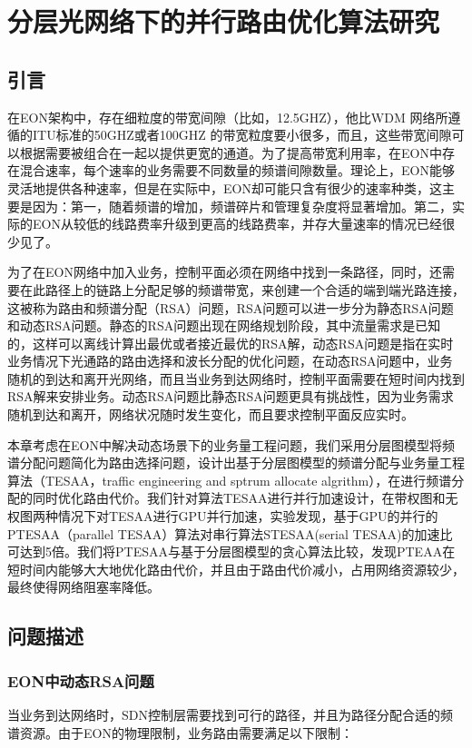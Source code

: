
\chapter{分层光网络下的并行路由优化算法研究}
\section{引言}
在EON架构中，存在细粒度的带宽间隙（比如，12.5GHZ），他比WDM 网络所遵循的ITU标准的50GHZ或者100GHZ 的带宽粒度要小很多，而且，这些带宽间隙可以根据需要被组合在一起以提供更宽的通道。为了提高带宽利用率，在EON中存在混合速率，每个速率的业务需要不同数量的频谱间隙数量。理论上，EON能够灵活地提供各种速率，但是在实际中，EON却可能只含有很少的速率种类，这主要是因为：第一，随着频谱的增加，频谱碎片和管理复杂度将显著增加。第二，实际的EON从较低的线路费率升级到更高的线路费率，并存大量速率的情况已经很少见了。

为了在EON网络中加入业务，控制平面必须在网络中找到一条路径，同时，还需要在此路径上的链路上分配足够的频谱带宽，来创建一个合适的端到端光路连接，这被称为路由和频谱分配（RSA）问题，RSA问题可以进一步分为静态RSA问题和动态RSA问题。静态的RSA问题出现在网络规划阶段，其中流量需求是已知的，这样可以离线计算出最优或者接近最优的RSA解，动态RSA问题是指在实时业务情况下光通路的路由选择和波长分配的优化问题，在动态RSA问题中，业务随机的到达和离开光网络，而且当业务到达网络时，控制平面需要在短时间内找到RSA解来安排业务。动态RSA问题比静态RSA问题更具有挑战性，因为业务需求随机到达和离开，网络状况随时发生变化，而且要求控制平面反应实时。

本章考虑在EON中解决动态场景下的业务量工程问题，我们采用分层图模型将频谱分配问题简化为路由选择问题，设计出基于分层图模型的频谱分配与业务量工程算法（TESAA，traffic engineering and sptrum allocate algrithm），在进行频谱分配的同时优化路由代价。我们针对算法TESAA进行并行加速设计，在带权图和无权图两种情况下对TESAA进行GPU并行加速，实验发现，基于GPU的并行的PTESAA（parallel TESAA）算法对串行算法STESAA(serial TESAA)的加速比可达到5倍。我们将PTESAA与基于分层图模型的贪心算法比较，发现PTEAA在短时间内能够大大地优化路由代价，并且由于路由代价减小，占用网络资源较少，最终使得网络阻塞率降低。
\section{问题描述}
\subsection{EON中动态RSA问题}
当业务到达网络时，SDN控制层需要找到可行的路径，并且为路径分配合适的频谱资源。由于EON的物理限制，业务路由需要满足以下限制：

